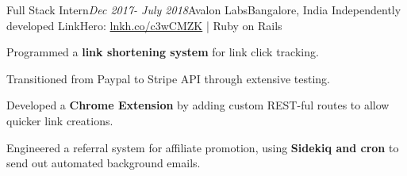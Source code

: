 \begin{rSubsection}{Full Stack Intern}{\em Dec 2017- July 2018}{Avalon Labs}{Bangalore, India}
    Independently developed LinkHero: \href{http://lnkh.co/c3wCMZK}{lnkh.co/c3wCMZK} | Ruby on Rails
    \item
    Programmed a \textbf{link shortening system} for link click tracking.
    \item 
    Transitioned from Paypal to Stripe API through extensive testing.
    \item
    Developed a \textbf{Chrome Extension} by adding custom REST-ful routes to allow quicker link creations.
    \item Engineered a referral system for affiliate promotion, using \textbf{Sidekiq and cron} to send out automated background emails.
\end{rSubsection}